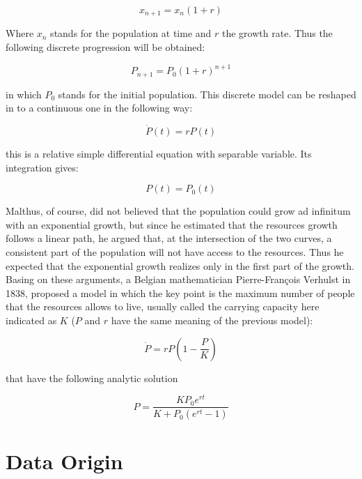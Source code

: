 \documentclass[
12pt, %
a4paper, %
oneside, %
headinclude,footinclude, %
BCOR5mm, %
]{scrartcl}
\begin{document}
\begin{equation}
x_{n+1}=x_{n}(1+r)
\end{equation}

Where $x_{n}$ stands for the population at time and $r$ the growth rate. Thus the following discrete progression will be obtained: 

\begin{equation}
P_{n+1}=P_{0}(1+r)^{n+1}
\end{equation}

in which $P_{0}$ stands for the initial population. This discrete model can be reshaped in to a continuous one in the following way: 

\begin{equation}
\dot{P}(t)=rP(t)
\end{equation}

this is a relative simple differential equation with separable variable. Its integration gives:

\begin{equation}
P(t)=P_{0}(t)
\end{equation}

Malthus, of course, did not believed that the population could grow ad infinitum with an exponential growth, but since he estimated that the resources growth follows a linear path, he argued that, at the intersection of the two curves, a consistent part of the population will not have access to the resources. Thus  he expected that the exponential growth realizes only in the first part of the growth. Basing on these arguments, a Belgian mathematician Pierre-François Verhulst in 1838, proposed a model \cite{verhulst1838notice} in which the key point is the maximum number of people that the resources allows to live, usually called the carrying capacity here indicated as $K$ ($P$ and $r$ have the same meaning of the previous model):

\begin{equation}
\dot{P}=rP\left(1-\dfrac{P}{K} \right)
\end{equation}

that have the following analytic solution 

\begin{equation}
P=\dfrac{KP_{0}e^{rt}}{K+P_{0}(e^{rt}-1)}
\end{equation}


\section{Data Origin} \label{Data Origin}
\end{document}
